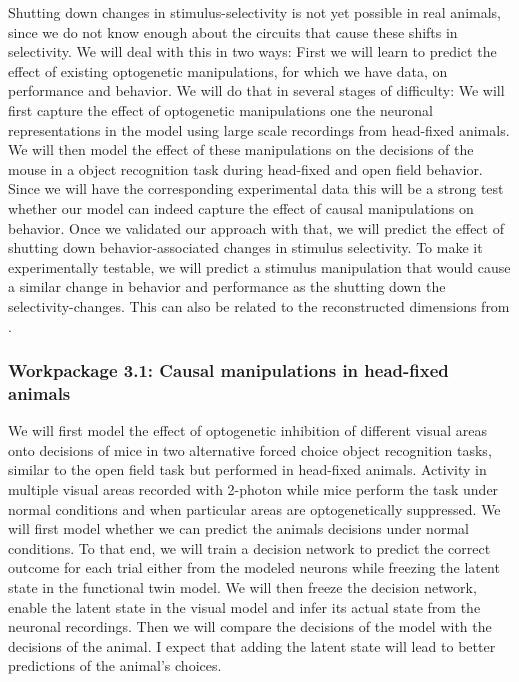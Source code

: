 \documentclass[B2,COG]{ercgrant}
\begin{document}
Shutting down changes in stimulus-selectivity is not yet possible in real animals, since we do not know enough about the circuits that cause these shifts in selectivity.
We will deal with this in two ways:  First we will learn to predict the effect of existing optogenetic manipulations, for which we have data, on performance and behavior.
We will do that in several stages of difficulty: We will first capture the effect of optogenetic manipulations one the neuronal representations in the model using large scale recordings from head-fixed animals. 
We will then model the effect of these manipulations on the decisions of the mouse in a object recognition task during head-fixed and open field behavior. 
Since we will have the corresponding experimental data this will be a strong test whether our model can indeed capture the effect of causal manipulations on behavior.
Once we validated our approach with that, we will predict the effect of shutting down behavior-associated changes in stimulus selectivity.
 To make it experimentally testable, we will predict a stimulus manipulation that would cause a similar change in behavior and performance as the shutting down the selectivity-changes.
This can also be related to the reconstructed dimensions from .

\subsubsection{Workpackage 3.1: Causal manipulations in head-fixed animals\hfill{}}
We will first model the effect of optogenetic inhibition of different visual areas onto decisions of mice in two alternative forced choice object recognition tasks, similar to the open field task but performed in head-fixed animals. 
Activity in multiple visual areas recorded with 2-photon while mice perform the task under normal conditions and when particular areas are optogenetically suppressed.
We will first model whether we can predict the animals decisions under normal conditions. 
To that end, we will train a decision network to predict the correct outcome for each trial either from the modeled neurons while freezing the  latent state in the functional twin model.
We will then freeze the decision network, enable the latent state in the visual model and infer its actual state from the neuronal recordings. 
Then we will compare the decisions of the model with the decisions of the animal. 
I expect that adding the latent state will lead to better predictions of the animal's choices. 
\end{document}
